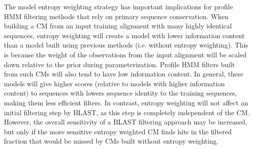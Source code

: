 \documentclass[11pt]{article}
\def\blast{\textsc{BLAST}~}
\begin{document}
The model entropy weighting strategy has important implications for
profile HMM filtering methods that rely on primary sequence
conservation.  When building a CM from an input training alignment
with many highly identical sequences, entropy weighting will create a
model with lower information content than a model built using previous
methods (i.e. without entropy weighting). This is because the weight of
the observations from the input alignment will be scaled down
relative to the prior during parameterization.  Profile HMM filters built
from such CMs will also tend to have low information content. In
general, these models will give higher scores (relative to models with
higher information content) to sequences with lowers
sequence identity to the training sequences, making them less
efficient filters. In contrast, entropy weighting will not affect an
initial filtering step by \textsc{BLAST}, as this step is completely
independent of the CM. However, the overall sensitivity of a
\textsc{BLAST} filtering approach may be increased, but only if the
more sensitive entropy weighted CM finds hits in the filtered fraction
that would be missed by CMs built without entropy weighting.

\end{document}
